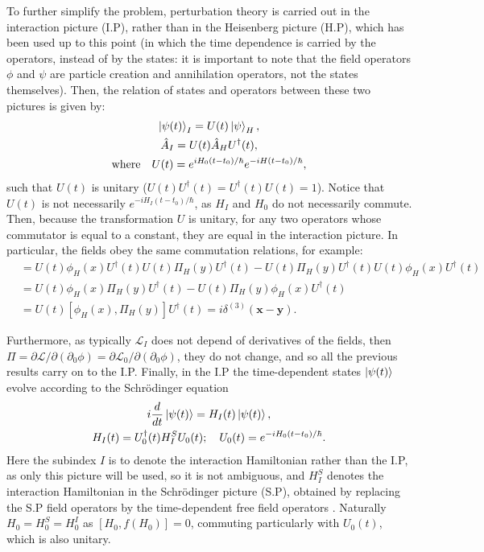 To further simplify the problem, perturbation theory is carried out in the interaction picture (I.P), rather than in the Heisenberg picture (H.P), which has been used up to this point (in which the time dependence is carried by the operators, instead of by the states: it is important to note that the field operators $\phi$ and $\psi$ are particle creation and annihilation operators, not the states themselves). Then, the relation of states and operators between these two pictures is given by:
\begin{gather*}
    \ket{\psi(t)}_I = U(t)\ket{\psi}_H, \\
    \hat{A}_I = U(t)\hat{A}_HU^{\dagger}(t), \\
    \textrm{where} \quad U(t) = e^{iH_0(t-t_0)/\hbar}e^{-iH(t-t_0)/\hbar},
\end{gather*}
such that $U(t)$ is unitary ($U(t)U^{\dagger}(t) = U^{\dagger}(t)U(t) = 1$). Notice that $U(t)$ is not necessarily $e^{-iH_I(t-t_0)/\hbar}$, as $H_I$ and $H_0$ do not necessarily commute. Then, because the transformation $U$ is unitary, for any two operators whose commutator is equal to a constant, they are equal in the interaction picture. In particular, the fields obey the same commutation relations, for example: 
\begin{align*}
[\phi_I(x),\Pi_I(y)] &= U(t)\phi_H(x)U^{\dagger}(t)U(t)\Pi_H(y)U^{\dagger}(t) - U(t)\Pi_H(y)U^{\dagger}(t)U(t)\phi_H(x)U^{\dagger}(t) \\
&= U(t)\phi_H(x)\Pi_H(y)U^{\dagger}(t) - U(t)\Pi_H(y)\phi_H(x)U^{\dagger}(t) \\
&= U(t)[\phi_H(x),\Pi_H(y)]U^{\dagger}(t) = i\delta^{(3)}(\bm{x}-\bm{y}). 
\end{align*}

Furthermore, as typically $\mathcal{L}_I$ does not depend of derivatives of the fields, then $\Pi = \partial\mathcal{L}/\partial(\partial_0\phi) = \partial\mathcal{L}_0/\partial(\partial_0\phi)$, they do not change, and so all the previous results carry on to the I.P. Finally, in the I.P the time-dependent states $\ket{\psi(t)}$ evolve according to the Schrödinger equation
\begin{gather}
\label{timeevolution}
    i\dfrac{d}{dt}\ket{\psi(t)} = H_I(t)\ket{\psi(t)}, \\
    H_I(t) = U_0^{\dagger}(t)H_I^SU_0(t); \quad U_0(t) = e^{-iH_0(t-t_0)/\hbar}. \nonumber
\end{gather}
Here the subindex $I$ is to denote the interaction Hamiltonian rather than the I.P, as only this picture will be used, so it is not ambiguous, and $H_I^S$ denotes the interaction Hamiltonian in the Schrödinger picture (S.P), obtained by replacing the S.P field operators by the time-dependent free field operators \cite{Mandl}. Naturally $H_0=H_0^S=H_0^I$ as $[H_0,f(H_0)] = 0$, commuting particularly with $U_0(t)$, which is also unitary. 

